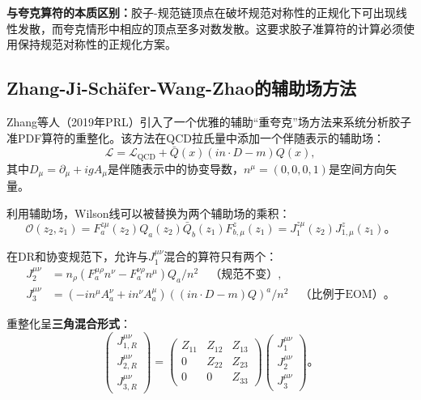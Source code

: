 \documentclass[12pt,a4paper]{ctexart}
\theoremstyle{definition}
\begin{document}
\textbf{与夸克算符的本质区别：}胶子-规范链顶点在破坏规范对称性的正规化下可出现线性发散，而夸克情形中相应的顶点至多对数发散。这要求胶子准算符的计算必须使用保持规范对称性的正规化方案。

\subsection{Zhang-Ji-Sch\"afer-Wang-Zhao的辅助场方法}

Zhang等人\cite{Zhang2019}（2019年PRL）引入了一个优雅的辅助``重夸克''场方法来系统分析胶子准PDF算符的重整化。该方法在QCD拉氏量中添加一个伴随表示的辅助场\cite{Zhang2019}：
\begin{equation}
\mathcal{L} = \mathcal{L}_{\text{QCD}} + \bar{Q}(x)(in \cdot D - m)Q(x),
\label{eq:auxiliary_lagrangian}
\end{equation}
其中$D_\mu = \partial_\mu + igA_\mu$是伴随表示中的协变导数，$n^\mu = (0,0,0,1)$是空间方向矢量。

利用辅助场，Wilson线可以被替换为两个辅助场的乘积\cite{Zhang2019}：
\begin{equation}
\mathcal{O}(z_2, z_1) = F^{z\mu}_a(z_2) Q_a(z_2) \bar{Q}_b(z_1) F^z_{b,\mu}(z_1) = J^{z\mu}_1(z_2) J^z_{1,\mu}(z_1)。
\label{eq:auxiliary_factorization}
\end{equation}

在DR和协变规范下，允许与$J^{\mu\nu}_1$混合的算符只有两个\cite{Zhang2019}：
\begin{equation}
\begin{aligned}
J^{\mu\nu}_2 &= n_\rho(F^{\mu\rho}_a n^\nu - F^{\nu\rho}_a n^\mu)Q_a/n^2 \quad \text{（规范不变）}, \\
J^{\mu\nu}_3 &= (-in^\mu A^\nu_a + in^\nu A^\mu_a)((in \cdot D - m)Q)^a/n^2 \quad \text{（比例于EOM）}。
\end{aligned}
\label{eq:mixing_operators}
\end{equation}

重整化呈\textbf{三角混合形式}\cite{Zhang2019}：
\begin{equation}
\begin{pmatrix} J^{\mu\nu}_{1,R} \\ J^{\mu\nu}_{2,R} \\ J^{\mu\nu}_{3,R} \end{pmatrix} =
\begin{pmatrix} Z_{11} & Z_{12} & Z_{13} \\ 0 & Z_{22} & Z_{23} \\ 0 & 0 & Z_{33} \end{pmatrix}
\begin{pmatrix} J^{\mu\nu}_1 \\ J^{\mu\nu}_2 \\ J^{\mu\nu}_3 \end{pmatrix}。
\label{eq:triangular_mixing}
\end{equation}
\end{document}
